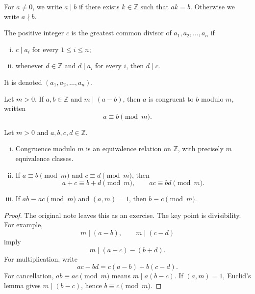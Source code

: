 \begin{definition}
For \(a\neq0\), we write \(a\mid b\) if there exists \(k\in\mathbb Z\) such that \(ak=b\).  Otherwise we write \(a\nmid b\).
\end{definition}

\begin{definition}
The positive integer \(c\) is the greatest common divisor of \(a_1,a_2,\dots,a_n\) if
\begin{enumerate}[(i)]
  \item \(c\mid a_i\) for every \(1\le i\le n\);
  \item whenever \(d\in\mathbb Z\) and \(d\mid a_i\) for every \(i\), then \(d\mid c\).
\end{enumerate}
It is denoted \((a_1,a_2,\dots,a_n)\).
\end{definition}

\begin{definition}
Let \(m>0\).  If \(a,b\in\mathbb Z\) and \(m\mid(a-b)\), then \(a\) is congruent to \(b\) modulo \(m\), written
\[
  a\equiv b\pmod m.
\]
\end{definition}

\begin{theorem}
Let \(m>0\) and \(a,b,c,d\in\mathbb Z\).
\begin{enumerate}[(i)]
  \item Congruence modulo \(m\) is an equivalence relation on \(\mathbb Z\), with precisely \(m\) equivalence classes.
  \item If \(a\equiv b\pmod m\) and \(c\equiv d\pmod m\), then
  \[
    a+c\equiv b+d\pmod m,
    \qquad
    ac\equiv bd\pmod m.
  \]
  \item If \(ab\equiv ac\pmod m\) and \((a,m)=1\), then \(b\equiv c\pmod m\).
\end{enumerate}
\end{theorem}

\begin{proof}
The original note leaves this as an exercise.  The key point is divisibility.  For example,
\[
  m\mid(a-b),\qquad m\mid(c-d)
\]
imply
\[
  m\mid (a+c)-(b+d).
\]
For multiplication, write
\[
  ac-bd=c(a-b)+b(c-d).
\]
For cancellation, \(ab\equiv ac\pmod m\) means \(m\mid a(b-c)\).  If \((a,m)=1\), Euclid's lemma gives \(m\mid(b-c)\), hence \(b\equiv c\pmod m\).
\end{proof}
